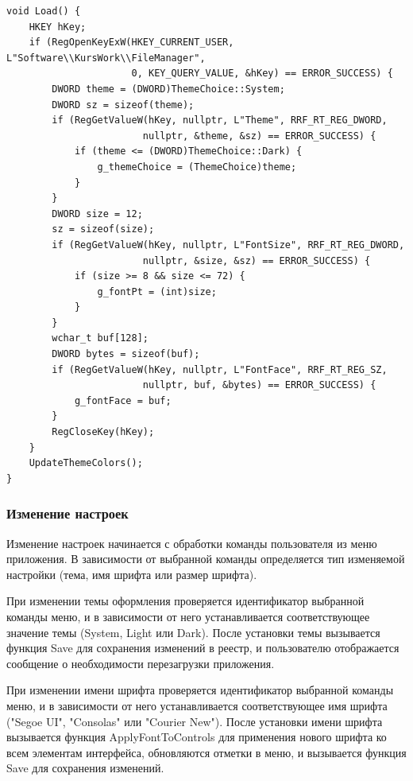 \begin{lstlisting}[style=CodeListing]
void Load() {
    HKEY hKey;
    if (RegOpenKeyExW(HKEY_CURRENT_USER, L"Software\\KursWork\\FileManager", 
                      0, KEY_QUERY_VALUE, &hKey) == ERROR_SUCCESS) {
        DWORD theme = (DWORD)ThemeChoice::System; 
        DWORD sz = sizeof(theme);
        if (RegGetValueW(hKey, nullptr, L"Theme", RRF_RT_REG_DWORD, 
                        nullptr, &theme, &sz) == ERROR_SUCCESS) {
            if (theme <= (DWORD)ThemeChoice::Dark) {
                g_themeChoice = (ThemeChoice)theme;
            }
        }
        DWORD size = 12; 
        sz = sizeof(size);
        if (RegGetValueW(hKey, nullptr, L"FontSize", RRF_RT_REG_DWORD, 
                        nullptr, &size, &sz) == ERROR_SUCCESS) {
            if (size >= 8 && size <= 72) {
                g_fontPt = (int)size;
            }
        }
        wchar_t buf[128]; 
        DWORD bytes = sizeof(buf);
        if (RegGetValueW(hKey, nullptr, L"FontFace", RRF_RT_REG_SZ, 
                        nullptr, buf, &bytes) == ERROR_SUCCESS) {
            g_fontFace = buf;
        }
        RegCloseKey(hKey);
    }
    UpdateThemeColors();
}
\end{lstlisting}

\subsubsection{Изменение настроек}

Изменение настроек начинается с обработки команды пользователя из меню приложения. В зависимости от выбранной команды определяется тип изменяемой настройки (тема, имя шрифта или размер шрифта).

При изменении темы оформления проверяется идентификатор выбранной команды меню, и в зависимости от него устанавливается соответствующее значение темы (System, Light или Dark). После установки темы вызывается функция Save для сохранения изменений в реестр, и пользователю отображается сообщение о необходимости перезагрузки приложения.

При изменении имени шрифта проверяется идентификатор выбранной команды меню, и в зависимости от него устанавливается соответствующее имя шрифта ("Segoe UI", "Consolas" или "Courier New"). После установки имени шрифта вызывается функция ApplyFontToControls для применения нового шрифта ко всем элементам интерфейса, обновляются отметки в меню, и вызывается функция Save для сохранения изменений.

